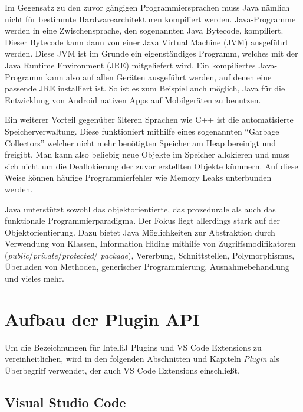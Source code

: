 Im Gegensatz 
zu den zuvor gängigen Programmiersprachen muss Java nämlich nicht für bestimmte 
Hardwarearchitekturen kompiliert werden. Java-Programme werden in eine 
Zwischensprache, den sogenannten Java Bytecode, kompiliert. Dieser Bytecode
kann dann von einer Java Virtual Machine (JVM) ausgeführt werden. Diese JVM ist
im Grunde ein eigenständiges Programm, welches mit der Java Runtime Environment 
(JRE) mitgeliefert wird. Ein kompiliertes Java-Programm kann also auf 
allen Geräten ausgeführt werden, auf denen eine passende JRE installiert ist. 
So ist es zum Beispiel auch möglich, Java für die Entwicklung von Android nativen
Apps auf Mobilgeräten zu benutzen.

Ein weiterer Vorteil gegenüber älteren Sprachen wie C++ ist die
automatisierte Speicherverwaltung. Diese funktioniert mithilfe eines 
sogenannten \enquote{Garbage Collectors} welcher nicht mehr benötigten Speicher
am Heap bereinigt und freigibt. Man kann also beliebig neue Objekte im Speicher
allokieren und muss sich nicht um die Deallokierung der zuvor erstellten Objekte
kümmern. Auf diese Weise können häufige Programmierfehler wie Memory Leaks unterbunden werden.

Java unterstützt sowohl das objektorientierte, das prozedurale als auch das funktionale 
Programmierparadigma. Der Fokus liegt allerdings stark auf der Objektorientierung. 
Dazu bietet Java Möglichkeiten zur Abstraktion durch Verwendung von Klassen, Information Hiding
mithilfe von Zugriffsmodifikatoren (\emph{public}/\emph{private}/\emph{protected}/\linebreak
\emph{package}), Vererbung, 
Schnittstellen, Polymorphismus, Überladen von Methoden, generischer Programmierung, 
Ausnahmebehandlung und vieles mehr.


\section{Aufbau der Plugin API}
\label{sec:AufbauDerPluginAPI}

Um die Bezeichnungen für IntelliJ Plugins und VS Code Extensions zu vereinheitlichen,
wird in den folgenden Abschnitten und Kapiteln \emph{Plugin} als Überbegriff
verwendet, der auch VS Code Extensions einschließt.

\subsection{Visual Studio Code}

